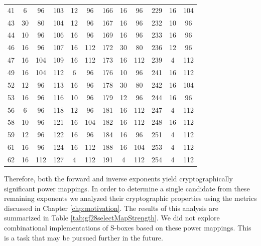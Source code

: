 \begin{table}[ht!]
\begin{center}
\begin{tabular}{|c|c|c||c|c|c||c|c|c||c|c|c|}
    41 & 6 & 96 & 103 & 12 & 96 & 166 & 16 & 96 & 229 & 16 & 104 \\ 
    43 & 30 & 80 & 104 & 12 & 96 & 167 & 16 & 96 & 232 & 10 & 96 \\
    44 & 10 & 96 & 106 & 16 & 96 & 169 & 16 & 96 & 233 & 16 & 96 \\ 
    46 & 16 & 96 & 107 & 16 & 112 & 172 & 30 & 80 & 236 & 12 & 96 \\
    47 & 16 & 104 & 109 & 16 & 112 & 173 & 16 & 112 & {\color{red} 239} & {\color{red} 4} & {\color{red} 112} \\
    49 & 16 & 104 & 112 & 6 & 96 & 176 & 10 & 96 & 241 & 16 & 112 \\ 
    52 & 12 & 96 & 113 & 16 & 96 & 178 & 30 & 80 & 242 & 16 & 104 \\ 
    53 & 16 & 96 & 116 & 10 & 96 & 179 & 12 & 96 & 244 & 16 & 96 \\ 
    56 & 6 & 96 & 118 & 12 & 96 & 181 & 16 & 112 & {\color{red} 247} & {\color{red} 4} & {\color{red} 112} \\
    58 & 10 & 96 & 121 & 16 & 104 & 182 & 16 & 112 & 248 & 16 & 112 \\
    59 & 12 & 96 & 122 & 16 & 96 & 184 & 16 & 96 & {\color{red} 251} & {\color{red} 4} & {\color{red} 112} \\ 
    61 & 16 & 96 & 124 & 16 & 112 & 188 & 16 & 104 & {\color{red} 253} & {\color{red} 4} & {\color{red} 112} \\ 
    62 & 16 & 112 & {\color{red} 127} & {\color{red} 4} & {\color{red} 112} & {\color{red} 191} & {\color{red} 4} & {\color{red} 112} & {\color{red} 254} & {\color{red} 4} & {\color{red} 112} \\ \hline
    \end{tabular}
\end{center}
\end{table}

Therefore, both the forward and inverse exponents yield cryptographically significant power mappings. In order to determine a single candidate from these remaining exponents we analyzed their cryptographic properties using the metrics discussed in Chapter \ref{chp:motivation}. The results of this analysis are summarized in Table \ref{tab:gf28selectMapStrength}. We did not explore combinational implementations of S-boxes based on these power mappings. This is a task that may be pursued further in the future.

